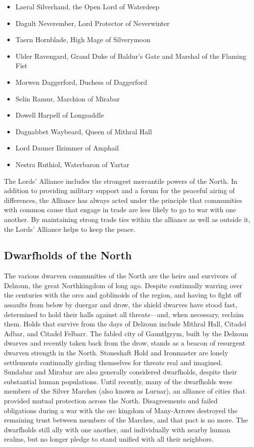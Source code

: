 \documentclass[10pt,a4paper,twoside,twocolumn,openany,bg=print,nodeprecatedcode]{dndbook}
\begin{document}
\begin{itemize}
\item Laeral Silverhand, the Open Lord of Waterdeep
\item Dagult Neverember, Lord Protector of Neverwinter
\item Taern Hornblade, High Mage of Silverymoon
\item Ulder Ravengard, Grand Duke of Baldur's Gate and Marshal of the Flaming Fist
\item Morwen Daggerford, Duchess of Daggerford
\item Selin Ramur, Marchion of Mirabar
\item Dowell Harpell of Longsaddle
\item Dagnabbet Waybeard, Queen of Mithral Hall
\item Lord Dauner Ilzimmer of Amphail
\item Nestra Ruthiol, Waterbaron of Yartar
\end{itemize}

The Lords' Alliance includes the strongest mercantile powers of the North. In addition to providing military support and a forum for the peaceful airing of differences, the Alliance has always acted under the principle that communities with common cause that engage in trade are less likely to go to war with one another. By maintaining strong trade ties within the alliance as well as outside it, the Lords' Alliance helps to keep the peace.
\subsection{Dwarfholds of the North}
The various dwarven communities of the North are the heirs and survivors of Delzoun, the great Northkingdom of long ago. Despite continually warring over the centuries with the orcs and goblinoids of the region, and having to fight off assaults from below by duergar and drow, the shield dwarves have stood fast, determined to hold their halls against all threats—and, when necessary, reclaim them.
Holds that survive from the days of Delzoun include Mithral Hall, Citadel Adbar, and Citadel Felbarr. The fabled city of Gauntlgrym, built by the Delzoun dwarves and recently taken back from the drow, stands as a beacon of resurgent dwarven strength in the North. Stoneshaft Hold and Ironmaster are lonely settlements continually girding themselves for threats real and imagined. Sundabar and Mirabar are also generally considered dwarfholds, despite their substantial human populations.
Until recently, many of the dwarfholds were members of the Silver Marches (also known as Luruar), an alliance of cities that provided mutual protection across the North. Disagreements and failed obligations during a war with the orc kingdom of Many-Arrows destroyed the remaining trust between members of the Marches, and that pact is no more. The dwarfholds still ally with one another, and individually with nearby human realms, but no longer pledge to stand unified with all their neighbors.
\end{document}
